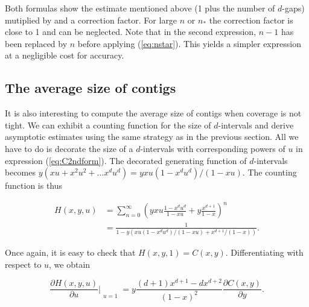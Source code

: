 \documentclass{article}
\begin{document}
Both formulas show the estimate mentioned above (1 plus the number of
$d$-gaps) mutiplied by and a correction factor. For large $n$ or $n_*$ the
correction factor is close to 1 and can be neglected.  Note that in the
second expression, $n-1$ has been replaced by $n$ before applying
(\ref{eq:nstar}). This yields a simpler expression at a negligible cost
for accuracy.

\subsection{The average size of contigs}

It is also interesting to compute the average size of contigs when
coverage is not tight. We can exhibit a counting function for the size of
$d$-intervals and derive asymptotic estimates using the same strategy as
in the previous section. All we have to do is decorate the size of a
$d$-intervals with corresponding powers of $u$ in expression
(\ref{eq:C2ndform}). The decorated generating function of $d$-intervals
becomes $y(xu + x^2u^2 + \ldots x^du^d) = yxu(1-x^du^d)/(1-xu)$. The
counting function is thus

\begin{equation*}
\begin{split}
H(x,y,u) &= \sum_{n=0}^\infty \left(yxu\frac{1-x^du^d}{1-xu} +
y\frac{x^{d+1}}{1-x}\right)^n \\
&= \frac{1}{1-y \left(xu(1-x^du^d)/(1-xu) +
x^{d+1}/(1-x) \right)}.
\end{split}
\end{equation*}

Once again, it is easy to check that $H(x,y,1) = C(x,y)$. Differentiating
with respect to $u$, we obtain

\begin{equation*}
\frac{\partial H(x,y,u)}{\partial u}\Bigr|_{\substack{\\u=1}}
= y \frac{(d+1)x^{d+1}-dx^{d+2}}{(1-x)^2} \frac{\partial C(x,y)}
{\partial y}.
\end{equation*}
\end{document}
